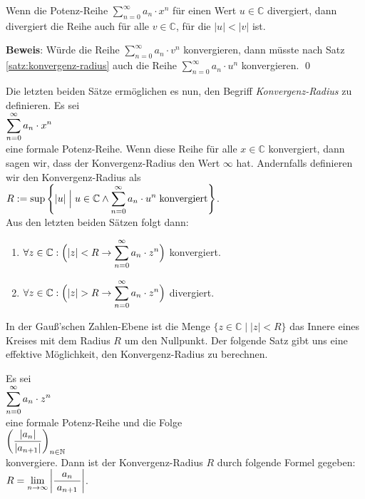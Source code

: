 \begin{Satz}
Wenn die Potenz-Reihe $\sum_{n=0}^\infty a_n\cdot x^n$ f\"ur einen Wert $u \in \mathbb{C}$
divergiert, dann divergiert die Reihe auch f\"ur alle $v \in \mathbb{C}$, f\"ur die
$|u| < |v|$ ist.
\end{Satz}

\noindent
\textbf{Beweis}:  W\"urde die Reihe $\sum_{n=0}^\infty a_n\cdot v^n$ konvergieren,
dann m\"usste nach Satz \ref{satz:konvergenz-radius} auch die Reihe 
$\sum_{n=0}^\infty a_n\cdot u^n$ konvergieren. \qed

\noindent
Die letzten beiden S\"atze erm\"oglichen es nun, den Begriff \emph{Konvergenz-Radius} zu
definieren.  Es sei 
\\[0.2cm]
\hspace*{1.3cm}
$\displaystyle\sum\limits_{n=0}^\infty a_n\cdot x^n$ 
\\[0.2cm]
eine formale Potenz-Reihe.
Wenn diese Reihe f\"ur alle $x\in\mathbb{C}$ konvergiert, dann sagen wir, dass der
Konvergenz-Radius den Wert $\infty$ hat.  Andernfalls definieren wir den Konvergenz-Radius
als
\\[0.2cm]
\hspace*{1.3cm}      
$R := \sup \left\{ |u| \;\Big|\; u \in \mathbb{C} \wedge
                   \displaystyle\sum\limits_{n=0}^\infty a_n\cdot u^n \;\mathrm{konvergiert} 
         \right\}
$.
\\[0.2cm]
Aus den letzten beiden S\"atzen folgt dann:
\begin{enumerate}
\item $\forall z \in \mathbb{C}:\Bigl( |z| < R \rightarrow \displaystyle\sum\limits_{n=0}^\infty a_n\cdot z^n\Bigr)$ konvergiert. 
\item $\forall z \in \mathbb{C}:\Bigl( |z| > R \rightarrow \displaystyle\sum\limits_{n=0}^\infty a_n\cdot z^n\Bigr)$ divergiert. 
\end{enumerate}
In der Gau\ss{}'schen Zahlen-Ebene ist die Menge 
$\bigl\{ z \in \mathbb{C} \;\big|\; |z| < R \bigr\}$ das Innere eines Kreises mit dem
Radius $R$ um den Nullpunkt.
Der folgende Satz gibt uns eine effektive M\"oglichkeit, den Konvergenz-Radius zu berechnen.

\begin{Satz}
Es sei 
\\[0.2cm]
\hspace*{1.3cm}
$\displaystyle\sum\limits_{n=0}^\infty a_n\cdot z^n$ 
\\[0.2cm]
eine formale Potenz-Reihe und die Folge
\\[0.2cm]
\hspace*{1.3cm}
$\displaystyle\left(\frac{|a_n|}{|a_{n+1}|}\right)_{n\in\mathbb{N}}$
\\[0.2cm]
 konvergiere.   Dann ist der Konvergenz-Radius $R$ durch
folgende Formel gegeben:
      \\[0.2cm]
      \hspace*{1.3cm}      
      $\displaystyle R = \lim\limits_{n\rightarrow\infty} \left|\frac{a_n}{\;a_{n+1}\;}\right|$.  
\end{Satz}

